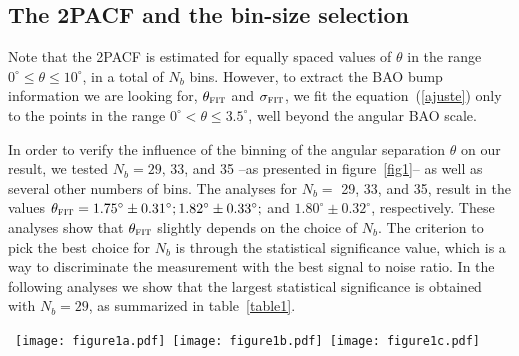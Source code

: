 \documentclass[a4paper,11pt]{article}
\begin{document}
\subsection{The 2PACF and the bin-size selection}\label{bin-size}

Note that the 2PACF is estimated for equally spaced values of $\theta$ in the range 
$0^{\circ} \leq \theta \leq {10^{\circ}}$, in a total of $N_{b}$ bins. 
However, to extract the BAO bump information we are looking for, $\theta_{\mbox{\footnotesize\sc fit}}$ 
and $\sigma_{\mbox{\footnotesize\sc fit}}$, we fit the equation~(\ref{ajuste}) only to the points in the 
range $0^{\circ} < \theta \leq {3.5^{\circ}}$, well beyond the angular BAO scale. 

In order to verify the influence of the binning of the angular separation $\theta$ on our result, 
we tested $N_{b} = 29, \,33$, and 35 --as presented in figure~\ref{fig1}-- as well as several other 
numbers of bins. 
The analyses for $N_{b} =$ 29, 33, and 35, result in the values 
$\theta_{\mbox{\footnotesize\sc fit}}=1.75^{\circ}\pm0.31^{\circ}; 1.82^{\circ}\pm0.33^{\circ};$ and 
$1.80^{\circ}\pm0.32^{\circ}$, respectively. 
These analyses show that $\theta_{\mbox{\footnotesize\sc fit}}$ slightly depends on the choice of 
$N_{b}$. 
The criterion to pick the best choice for $N_{b}$ is through the statistical significance value, which is a way to discriminate the measurement with the best signal to noise ratio. 
In the following analyses we show that the largest statistical significance is obtained with 
$N_{b}=29$, as summarized in table~\ref{table1}. 



\begin{figure*}%
\mbox{\hspace{-0.6cm}
\texttt{[image: figure1a.pdf]}
\hspace{-0.7cm}
\texttt{[image: figure1b.pdf]}
\hspace{-0.7cm}
\texttt{[image: figure1c.pdf]}
}
\vspace{-0.5cm}
\caption{The 2PACF calculated from the sample DR12Q at $\overline{z} = 2.225$ (dots) and 
the best-fit curve obtained using the equation (\ref{ajuste}) (continuous line). 
In this case we have used $N_{b}=29$ (left panel), $N_{b}=33$ (center panel), and $N_{b}=35$ (right 
panel), see the text for details.} 
\label{fig1}
\end{figure*}
\end{document}
